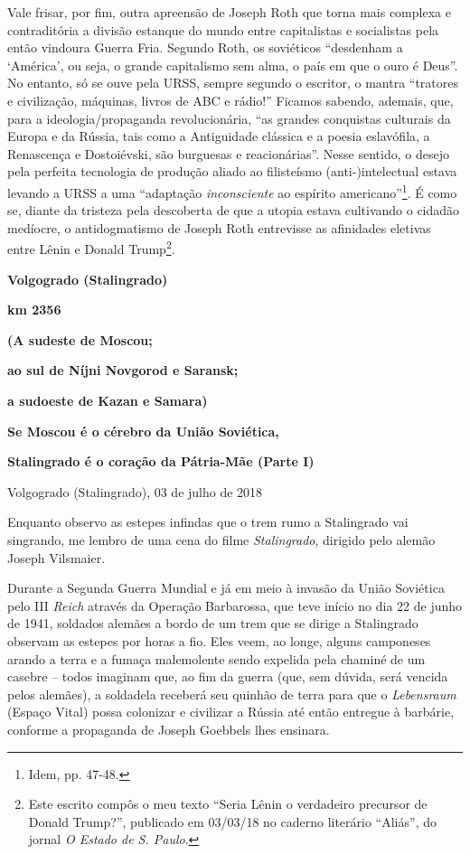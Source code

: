 Vale frisar, por fim, outra apreensão de Joseph Roth que torna mais
complexa e contraditória a divisão estanque do mundo entre capitalistas
e socialistas pela então vindoura Guerra Fria. Segundo Roth, os
soviéticos ``desdenham a `América', ou seja, o grande capitalismo sem
alma, o país em que o ouro é Deus''. No entanto, só se ouve pela URSS,
sempre segundo o escritor, o mantra ``tratores e civilização, máquinas,
livros de ABC e rádio!'' Ficamos sabendo, ademais, que, para a
ideologia/propaganda revolucionária, ``as grandes conquistas culturais
da Europa e da Rússia, tais como a Antiguidade clássica e a poesia
eslavófila, a Renascença e Dostoiévski, são burguesas e reacionárias''.
Nesse sentido, o desejo pela perfeita tecnologia de produção aliado ao
filisteísmo (anti-)intelectual estava levando a URSS a uma ``adaptação
\emph{inconsciente} ao espírito americano''\footnote{Idem, pp. 47-48.}.
É como se, diante da tristeza pela descoberta de que a utopia estava
cultivando o cidadão medíocre, o antidogmatismo de Joseph Roth
entrevisse as afinidades eletivas entre Lênin e Donald Trump\footnote{Este
  escrito compôs o meu texto ``Seria Lênin o verdadeiro precursor de
  Donald Trump?'', publicado em 03/03/18 no caderno literário ``Aliás'',
  do jornal \emph{O Estado de S. Paulo}.}.

\textbf{Volgogrado (Stalingrado)}

\textbf{km 2356}

\textbf{(A sudeste de Moscou; }

\textbf{ao sul de Níjni Novgorod e Saransk; }

\textbf{a sudoeste de Kazan e Samara)}

\textbf{Se Moscou é o cérebro da União Soviética, }

\textbf{Stalingrado é o coração da Pátria-Mãe (Parte I)}

Volgogrado (Stalingrado), 03 de julho de 2018

Enquanto observo as estepes infindas que o trem rumo a Stalingrado vai
singrando, me lembro de uma cena do filme \emph{Stalingrado}, dirigido
pelo alemão Joseph Vilsmaier.

Durante a Segunda Guerra Mundial e já em meio à invasão da União
Soviética pelo III \emph{Reich} através da Operação Barbarossa, que teve
início no dia 22 de junho de 1941, soldados alemães a bordo de um trem
que se dirige a Stalingrado observam as estepes por horas a fio. Eles
veem, ao longe, alguns camponeses arando a terra e a fumaça malemolente
sendo expelida pela chaminé de um casebre -- todos imaginam que, ao fim
da guerra (que, sem dúvida, será vencida pelos alemães), a soldadela
receberá seu quinhão de terra para que o \emph{Lebensraum} (Espaço
Vital) possa colonizar e civilizar a Rússia até então entregue à
barbárie, conforme a propaganda de Joseph Goebbels lhes ensinara.

